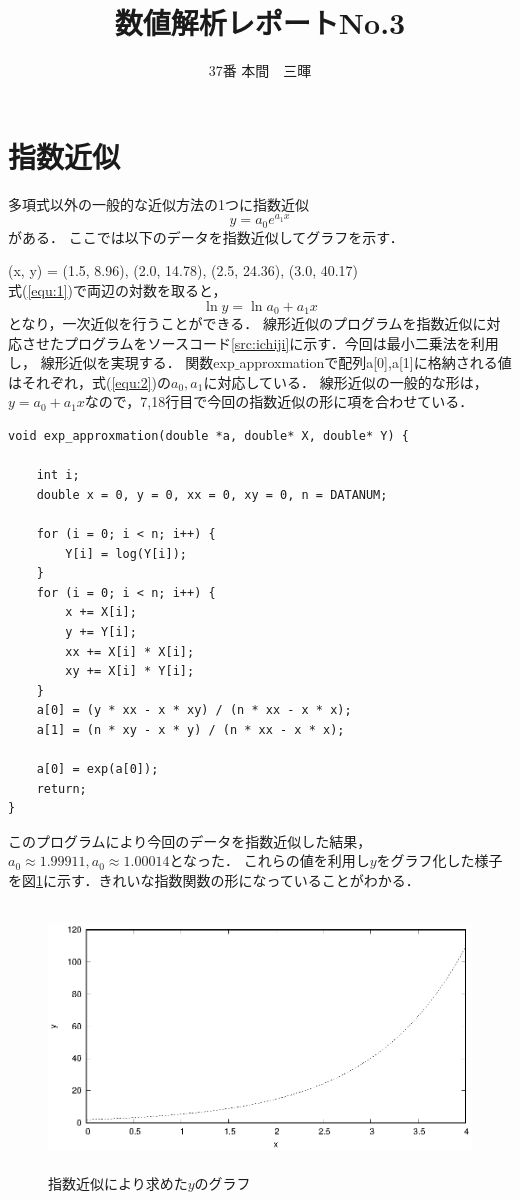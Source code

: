 \documentclass[titlepage]{jsarticle}
\begin{document}
\title{数値解析レポートNo.3}
\author{37番 	本間　三暉}
\date{}
\maketitle

\section{指数近似}
多項式以外の一般的な近似方法の1つに指数近似
\begin{equation}
	y = a_0e^{a_1x}
	\label{equ:1}
\end{equation}
がある．
ここでは以下のデータを指数近似してグラフを示す．

(x, y) = (1.5, 8.96), (2.0, 14.78), (2.5, 24.36), (3.0, 40.17)\\
式(\ref{equ:1})で両辺の対数を取ると，
\begin{equation}
	\ln y = \ln a_0 + a_1x
	\label{equ:2}
\end{equation}
となり，一次近似を行うことができる．
線形近似のプログラムを指数近似に対応させたプログラムをソースコード\ref{src:ichiji}に示す．今回は最小二乗法を利用し，
線形近似を実現する．
関数exp$\_$approxmationで配列a[0],a[1]に格納される値はそれぞれ，式(\ref{equ:2})の$a_0,a_1$に対応している．
線形近似の一般的な形は，$y = a_0 + a_1 x$なので，7,18行目で今回の指数近似の形に項を合わせている．
\begin{lstlisting}[caption=作成した指数近似を行うプログラム\cite{wiki},label=src:ichiji]
void exp_approxmation(double *a, double* X, double* Y) {
	
	int i;
	double x = 0, y = 0, xx = 0, xy = 0, n = DATANUM;

	for (i = 0; i < n; i++) {
		Y[i] = log(Y[i]);
	}
	for (i = 0; i < n; i++) {
		x += X[i];
		y += Y[i];
		xx += X[i] * X[i];
		xy += X[i] * Y[i];
	}
	a[0] = (y * xx - x * xy) / (n * xx - x * x);
	a[1] = (n * xy - x * y) / (n * xx - x * x);

	a[0] = exp(a[0]);
	return;
}
\end{lstlisting}
このプログラムにより今回のデータを指数近似した結果，$a_0\approx 1.99911,a_0\approx 1.00014$となった．
これらの値を利用し$y$をグラフ化した様子を図\ref{fig:1}に示す．きれいな指数関数の形になっていることがわかる．

\begin{figure}[]
	\centering
	\includegraphics[height=7cm]{1/res.eps}
	\caption{指数近似により求めた$y$のグラフ}
	\label{fig:1}
\end{figure}
\end{document}
